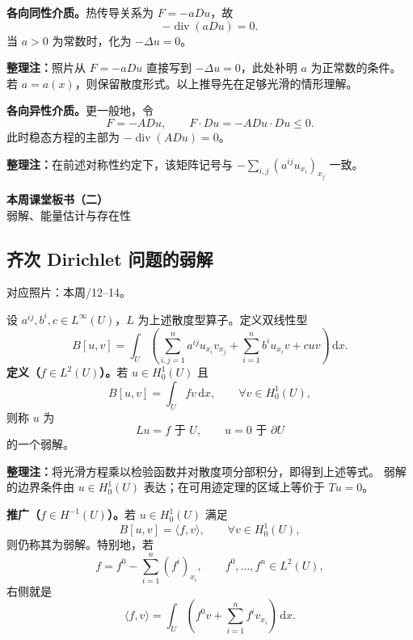 \documentclass[UTF8,a4paper,11pt,fontset=fandol]{ctexart}
\newcommand{\dd}{\,\mathrm d}
\newcommand{\ednote}[1]{\par{\small\color{notegray}\textbf{整理注：}#1}\par}
\newcommand{\source}[1]{{\small\color{notegray}对应照片：#1。}\par}
\begin{document}
\begin{center}
\end{center}

\textbf{各向同性介质。}热传导关系为 $F=-aDu$，故
\[
-\operatorname{div}(aDu)=0.
\]
当 $a>0$ 为常数时，化为 $-\Delta u=0$。
\ednote{照片从 $F=-aDu$ 直接写到 $-\Delta u=0$，此处补明 $a$ 为正常数的条件。
若 $a=a(x)$，则保留散度形式。以上推导先在足够光滑的情形理解。}

\textbf{各向异性介质。}更一般地，令
\[
F=-ADu,\qquad F\cdot Du=-ADu\cdot Du\leq0.
\]
此时稳态方程的主部为 $-\operatorname{div}(ADu)=0$。
\ednote{在前述对称性约定下，该矩阵记号与 $-\sum_{i,j}(a^{ij}u_{x_i})_{x_j}$ 一致。}

\newpage
\begin{center}
{\LARGE\bfseries 本周课堂板书（二）}\\[5pt]
{弱解、能量估计与存在性}
\end{center}
\subsection{齐次 Dirichlet 问题的弱解}
\source{本周/12--14}
设 $a^{ij},b^i,c\in L^\infty(U)$，$L$ 为上述散度型算子。定义双线性型
\[
\boxed{B[u,v]=\int_U\left(
\sum_{i,j=1}^na^{ij}u_{x_i}v_{x_j}
+\sum_{i=1}^nb^iu_{x_i}v+cuv\right)\dd x.}
\]
\textbf{定义（$f\in L^2(U)$）。}若 $u\in H_0^1(U)$ 且
\[
B[u,v]=\int_Ufv\dd x,\qquad\forall v\in H_0^1(U),
\]
则称 $u$ 为
\[
Lu=f\text{ 于 }U,\qquad u=0\text{ 于 }\partial U
\]
的一个弱解。
\ednote{将光滑方程乘以检验函数并对散度项分部积分，即得到上述等式。
弱解的边界条件由 $u\in H_0^1(U)$ 表达；在可用迹定理的区域上等价于 $Tu=0$。}

\textbf{推广（$f\in H^{-1}(U)$）。}若 $u\in H_0^1(U)$ 满足
\[
\boxed{B[u,v]=\langle f,v\rangle,\qquad\forall v\in H_0^1(U),}
\]
则仍称其为弱解。特别地，若
\[
f=f^0-\sum_{i=1}^n(f^i)_{x_i},\qquad f^0,\ldots,f^n\in L^2(U),
\]
右侧就是
\[
\langle f,v\rangle
=\int_U\left(f^0v+\sum_{i=1}^nf^iv_{x_i}\right)\dd x.
\]
\end{document}
